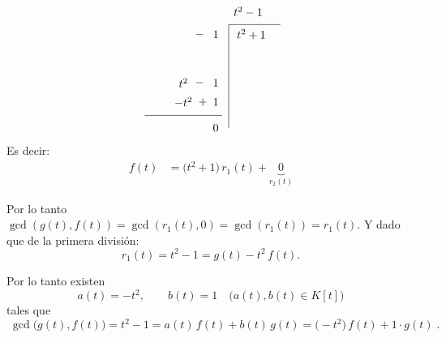 \begin{solution}
\[\begin{tikzpicture}[baseline={(current bounding box.north)}]
            \node at (.5,0.3) {$-$};
            \node at (1,0.3) {$1$};
            \draw (1.4,0.6) -- (3,0.6);
            \draw (1.4,0.6) -- (1.4,-2.6);
            \node at (2,1.0) {$t^2- 1$};
            \node at (2.1,0.3) {$t^2+1$};
            \node at (0,-1.2) {$t^2$};
            \node at (0.5,-1.2) {$-$};
            \node at (1,-1.2) {$1$};
            \node at (0,-2.2) {$\underline{\hspace{2.4cm}}$};
            \node at (0,-1.8) {$-t^2$};
            \node at (0.6,-1.8) {$+$};
            \node at (1,-1.8) {$1$};
            \node at (1,-2.6) {$0$};

          \end{tikzpicture}
          \]
        Es decir:
        \begin{align*}
          f(t)&=\bigl(t^{2}+1\bigr)\,r_{1}(t)+\underbrace{0}_{r_{2}(t)}
        \end{align*}
        
        Por lo tanto $\gcd(g(t),f(t))=\gcd(r_{1}(t),0)=\gcd(r_{1}(t))=r_{1}(t)$. Y dado que de la primera división:
        \[
        r_{1}(t)=t^{2}-1=g(t)-t^{2}\,f(t).
        \]
        
        Por lo tanto existen
        \[
        a(t)=-t^{2}, \qquad b(t)=1 \quad\bigl(a(t),b(t)\in K[t]\bigr)
        \]
        tales que
        \[
        \boxed{\;
        \gcd\!\bigl(g(t),f(t)\bigr)=t^{2}-1
            =a(t)\,f(t)+b(t)\,g(t)
            =\bigl(-t^{2}\bigr)\,f(t)+1\cdot g(t)
        \;} .
        \]
\end{solution}